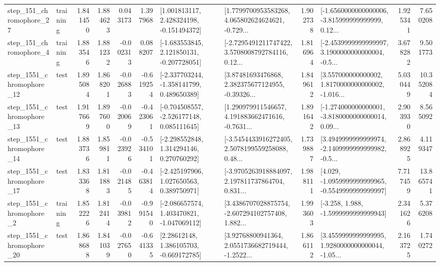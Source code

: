 \begin{tabular}{llrrrrllrlrr}
  step\_151\_chromophore\_27 &  training &      1.841450 &    1.884623 &      0.043173 &  1.397968 &    [1.001813117, 2.428324198, -0.151494372] &  [1.7799700953583268, 4.065802624624621, -0.729... &       1.902738 &  [-1.6560000000000006, -3.815999999999999, 0.12... &            1.925341 &          7.650208 \\
   step\_151\_chromophore\_4 &  training &      1.883546 &    1.881232 &     -0.002313 &  0.088207 &   [-1.683553845, 2.121850131, -0.207728051] &  [-2.7295491211747422, 3.5708008792784116, 0.12... &       1.816964 &  [-2.4539999999999997, 3.1900000000000004, -0.5... &            3.678282 &          9.501773 \\
 step\_1551\_chromophore\_12 &      test &      1.895084 &    1.868201 &     -0.026883 & -0.619254 &   [-2.337703244, -1.358141799, 0.489650389] &  [3.87481693476868, 2.382375677124955, -0.39326... &       1.849612 &  [3.557000000000002, 1.8170000000000002, -1.016... &            5.030449 &         10.352084 \\
 step\_1551\_chromophore\_13 &      test &      1.917669 &    1.897600 &     -0.020069 & -0.423061 &   [-0.704508557, -2.526177148, 0.085111645] &  [1.290979911546657, 4.191883662471616, -0.7631... &       1.891642 &  [-1.274000000000001, -3.8180000000000014, 0.09... &            2.903930 &          8.565092 \\
 step\_1551\_chromophore\_14 &      test &      1.883736 &    1.859811 &     -0.023926 & -0.534101 &    [-2.298552848, 1.314294146, 0.270760292] &  [-3.5454433916272405, 2.5078199559258088, 0.48... &       1.739887 &  [3.4949999999999974, -2.1409999999999982, -0.5... &            2.868925 &          4.119347 \\
 step\_1551\_chromophore\_17 &      test &      1.833368 &    1.811883 &     -0.021485 & -0.463814 &    [-2.425197906, 1.027650563, 0.389750971] &  [-3.9705263918884097, 2.197811737864704, 0.831... &       1.988111 &  [4.029, -1.0959999999999965, -0.5549999999999997] &            7.717459 &         13.865741 \\
  step\_1551\_chromophore\_2 &  training &      1.852226 &    1.812414 &     -0.039812 & -0.991540 &   [-2.086657574, 1.403470821, -1.047069112] &  [3.4386707028875754, -2.607294102757408, 1.882... &       1.993603 &               [-3.258, 1.988, -1.5999999999999943] &            2.341626 &          5.376208 \\
 step\_1551\_chromophore\_20 &      test &      1.868688 &    1.841039 &     -0.027650 & -0.641335 &     [2.28612148, 1.386105703, -0.669172785] &  [3.92768800941364, 2.0551736682719444, -1.2522... &       1.866112 &  [3.4559999999999995, 1.9280000000000044, -1.05... &            2.163725 &          1.740272 \\

\end{tabular}
